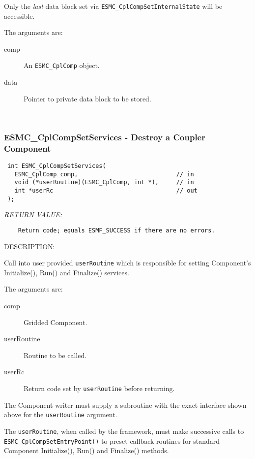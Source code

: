     Only the {\em last} data block set via
    {\tt ESMC\_CplCompSetInternalState} will be accessible.
  
    The arguments are:
    \begin{description}
    \item[comp]
      An {\tt ESMC\_CplComp} object.
    \item[data]
      Pointer to private data block to be stored.
   \end{description}
   
 
\mbox{}\hrulefill\ 
 
\subsubsection [ESMC\_CplCompSetServices] {ESMC\_CplCompSetServices - Destroy a Coupler Component}


  
\begin{verbatim} int ESMC_CplCompSetServices(
   ESMC_CplComp comp,                            // in
   void (*userRoutine)(ESMC_CplComp, int *),     // in
   int *userRc                                   // out
 );\end{verbatim}{\em RETURN VALUE:}
\begin{verbatim}    Return code; equals ESMF_SUCCESS if there are no errors.\end{verbatim}
{\sf DESCRIPTION:\\ }


  
    Call into user provided {\tt userRoutine} which is responsible for setting
    Component's Initialize(), Run() and Finalize() services.
  
    The arguments are:
    \begin{description}
    \item[comp]
      Gridded Component. 
    \item[userRoutine]
      Routine to be called.
    \item[userRc]
      Return code set by {\tt userRoutine} before returning.
    \end{description}
    
    The Component writer must supply a subroutine with the exact interface shown
    above for the {\tt userRoutine} argument.
  
    The {\tt userRoutine}, when called by the framework, must make successive
    calls to {\tt ESMC\_CplCompSetEntryPoint()} to preset callback routines for
    standard Component Initialize(), Run() and Finalize() methods. 
  
\setlength{\parskip}{\oldparskip}
\setlength{\parindent}{\oldparindent}
\setlength{\baselineskip}{\oldbaselineskip}
